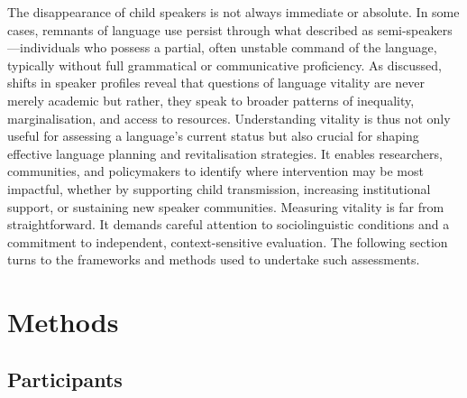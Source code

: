 \documentclass[a4paper,11pt]{article}
\begin{document}
The disappearance of child speakers is not always immediate or absolute. In some cases, remnants of language use persist through what \citet{dorian1981language} described as semi-speakers—individuals who possess a partial, often unstable command of the language, typically without full grammatical or communicative proficiency. As discussed, shifts in speaker profiles reveal that questions of language vitality are never merely academic but rather, they speak to broader patterns of inequality, marginalisation, and access to resources. Understanding vitality is thus not only useful for assessing a language’s current status but also crucial for shaping effective language planning and revitalisation strategies. It enables researchers, communities, and policymakers to identify where intervention may be most impactful, whether by supporting child transmission, increasing institutional support, or sustaining new speaker communities. Measuring vitality is far from straightforward. It demands careful attention to sociolinguistic conditions and a commitment to independent, context-sensitive evaluation. The following section turns to the frameworks and methods used to undertake such assessments.


\section{Methods}

\subsection{Participants}
\end{document}
